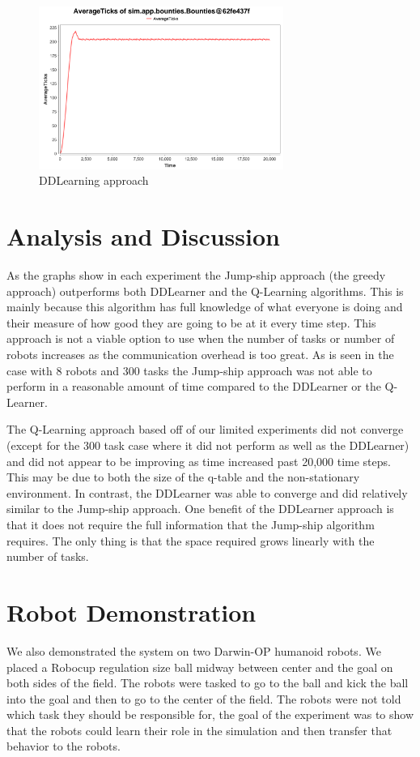 \documentclass[twocolumn]{article}
\begin{document}
\begin{figure}[H]
\includegraphics[width=8cm]{specialdd2and10}
\caption{DDLearning approach}
\end{figure}


\section{Analysis and Discussion}

As the graphs show in each experiment the Jump-ship approach (the greedy approach) outperforms both DDLearner and the Q-Learning algorithms.  This is mainly because this algorithm has full knowledge of what everyone is doing and their measure of how good they are going to be at it every time step.  This approach is not a viable option to use when the number of tasks or number of robots increases as the communication overhead is too great.  As is seen in the case with 8 robots and 300 tasks the Jump-ship approach was not able to perform in a reasonable amount of time compared to the DDLearner or the Q-Learner.

The Q-Learning approach based off of our limited experiments did not converge (except for the 300 task case where it did not perform as well as the DDLearner) and did not appear to be improving as time increased past 20,000 time steps.  This may be due to both the size of the q-table and the non-stationary environment.  In contrast, the DDLearner was able to converge and did relatively similar to the Jump-ship approach.  One benefit of the DDLearner approach is that it does not require the full information that the Jump-ship algorithm requires.  The only thing is that the space required grows linearly with the number of tasks.


\section{Robot Demonstration}
We also demonstrated the system on two Darwin-OP humanoid robots.  We placed a Robocup regulation size ball midway between center and the goal on both sides of the field.  The robots were tasked to go to the ball and kick the ball into the goal and then to go to the center of the field.  The robots were not told which task they should be responsible for, the goal of the experiment was to show that the robots could learn their role in the simulation and then transfer that behavior to the robots.    
\end{document}
